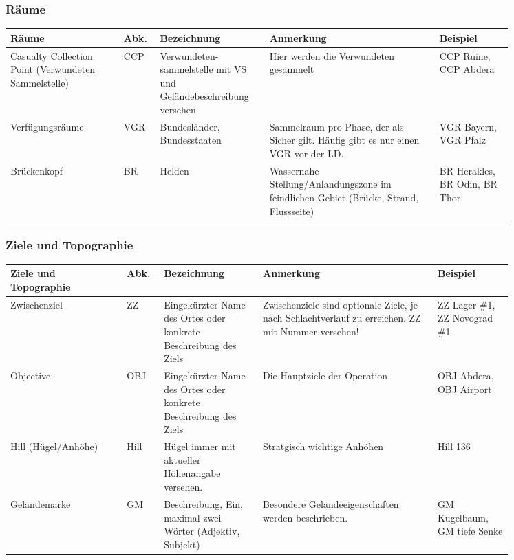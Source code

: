 \subsubsection{Räume}
\begin{longtable}{|p{0.2\linewidth}|p{0.05\linewidth}|p{0.17\linewidth}|p{0.3\linewidth}|p{0.13\linewidth}|} 																					\hline
	Räume	&	Abk.	&	Bezeichnung		&	Anmerkung 	&	Beispiel \\ \hline
	Casualty Collection Point (Verwundeten Sammelstelle) & CCP	& 	Verwundeten- sammelstelle mit VS und Geländebeschreibung versehen & Hier werden die Verwundeten gesammelt	& 	CCP Ruine, CCP Abdera	\\ \hline
	Verfügungsräume		&	VGR		&	Bundesländer, Bundesstaaten	&	Sammelraum pro Phase, der als Sicher gilt. Häufig gibt es nur einen VGR vor der LD. 	&	VGR Bayern, VGR Pfalz \\ \hline
	Brückenkopf	&	BR	&	Helden	&	Wassernahe Stellung/Anlandungszone  im feindlichen Gebiet (Brücke, Strand, Flussseite)	& BR Herakles, BR Odin, BR Thor \\ \hline
\end{longtable}

\subsubsection{Ziele und Topographie}
\begin{longtable}{|p{0.2\linewidth}|p{0.05\linewidth}|p{0.17\linewidth}|p{0.3\linewidth}|p{0.13\linewidth}|} 																					\hline
	Ziele und Topographie	&	Abk.	&	Bezeichnung		&	Anmerkung 	&	Beispiel \\ 
	\hline
	Zwischenziel	&	ZZ	&	Eingekürzter Name des Ortes oder konkrete Beschreibung des Ziels	&	Zwischenziele sind optionale Ziele, je nach Schlachtverlauf zu erreichen. ZZ mit Nummer versehen!	& ZZ Lager \#1, ZZ Novograd \#1 \\ 
	\hline
	Objective	&	OBJ		&	Eingekürzter Name des Ortes oder konkrete Beschreibung des Ziels	&	Die Hauptziele der Operation	&	OBJ Abdera, OBJ Airport	\\ 
	\hline
	Hill (Hügel/Anhöhe)		&	Hill	&	Hügel immer mit aktueller Höhenangabe versehen.	&	Stratgisch wichtige Anhöhen	&	Hill 136	\\ 
	\hline
	Geländemarke	&	GM	&	Beschreibung, Ein, maximal zwei Wörter (Adjektiv, Subjekt)	&	Besondere Geländeeigenschaften werden beschrieben.	& 	GM Kugelbaum, GM tiefe Senke \\ \hline
\end{longtable}

